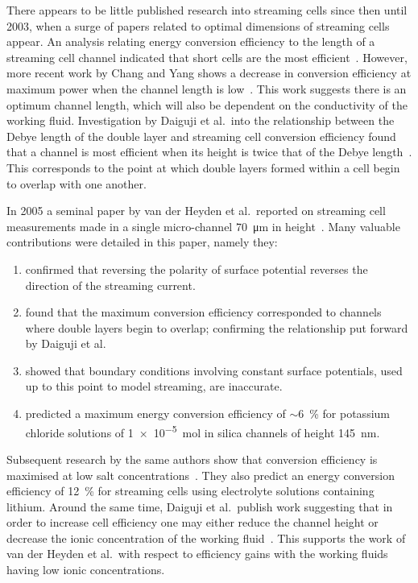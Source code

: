     There appears to be little published research into streaming cells since then until 2003, when a surge of papers related to optimal dimensions of streaming cells appear.
    An analysis relating energy conversion efficiency to the length of a streaming cell channel indicated that short cells are the most efficient~\cite{Yang2003}.
    However, more recent work by Chang and Yang shows a decrease in conversion efficiency at maximum power when the channel length is low~\cite{Chang2009}.
    This work suggests there is an optimum channel length, which will also be dependent on the conductivity of the working fluid.
    Investigation by Daiguji et al.\ into the relationship between the Debye length of the double layer and streaming cell conversion efficiency found that a channel is most efficient when its height is twice that of the Debye length~\cite{Daiguji2004}.
    This corresponds to the point at which double layers formed within a cell begin to overlap with one another.

    In 2005 a seminal paper by van der Heyden et al.\ reported on streaming cell measurements made in a single micro-channel \SI{70}{\micro\meter} in height~\cite{VanderHeyden2005}.
    Many valuable contributions were detailed in this paper, namely they:
    \begin{enumerate}
      \item confirmed that reversing the polarity of surface potential reverses the direction of the streaming current.
      \item found that the maximum conversion efficiency corresponded to channels where double layers begin to overlap; confirming the relationship put forward by Daiguji et al.\ ~\cite{Daiguji2004}
      \item showed that boundary conditions involving constant surface potentials, used up to this point to model streaming, are inaccurate.
      \item predicted a maximum energy conversion efficiency of $\sim$\SI{6}{\percent} for potassium chloride solutions of \SI{1e-5}{\mole} in silica channels of height \SI{145}{\nano\meter}.
    \end{enumerate}
    Subsequent research by the same authors show that conversion efficiency is maximised at low salt concentrations~\cite{VanderHeyden2006}.
    They also predict an energy conversion efficiency of \SI{12}{\percent} for streaming cells using electrolyte solutions containing lithium.
    Around the same time, Daiguji et al.\ publish work suggesting that in order to increase cell efficiency one may either reduce the channel height or decrease the ionic concentration of the working fluid~\cite{Daiguji2006}.
    This supports the work of van der Heyden et al.\ with respect to efficiency gains with the working fluids having low ionic concentrations.

